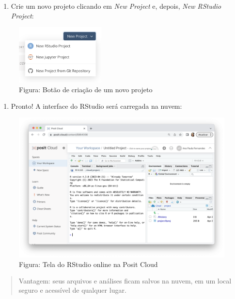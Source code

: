 \documentclass[
]{book}
\providecommand{\tightlist}{%
  \setlength{\itemsep}{0pt}\setlength{\parskip}{0pt}}
\begin{document}
\begin{enumerate}
\def\labelenumi{\arabic{enumi}.}
\setcounter{enumi}{3}
\tightlist
\item
  Crie um novo projeto clicando em \emph{New Project} e, depois, \emph{New RStudio Project}:
\end{enumerate}

\begin{figure}
\centering
\includegraphics[width=0.4\textwidth,height=\textheight]{telaCriarProjetoRStudio.png}
\caption{Figura: Botão de criação de um novo projeto}
\end{figure}

\begin{enumerate}
\def\labelenumi{\arabic{enumi}.}
\setcounter{enumi}{4}
\tightlist
\item
  Pronto! A interface do RStudio será carregada na nuvem:
\end{enumerate}

\begin{figure}
\centering
\includegraphics{telaRStudioPosit.png}
\caption{Figura: Tela do RStudio online na Posit Cloud}
\end{figure}

\begin{quote}
Vantagem: seus arquivos e análises ficam salvos na nuvem, em um local seguro e acessível de qualquer lugar.
\end{quote}
\end{document}
